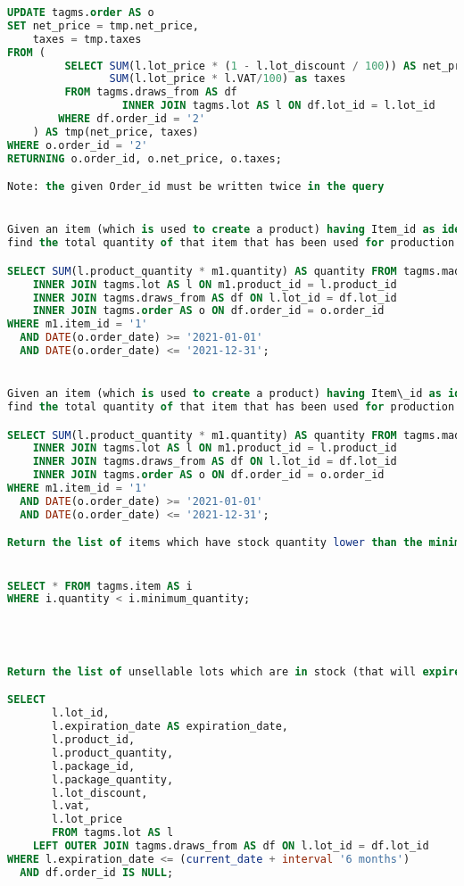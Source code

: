 \begin{lstlisting}[language=SQL,
keywordstyle=\color{blue},
stringstyle=\color{mauve},
showstringspaces=false,
basicstyle=\ttfamily\footnotesize]
UPDATE tagms.order AS o
SET net_price = tmp.net_price,
    taxes = tmp.taxes
FROM (
         SELECT SUM(l.lot_price * (1 - l.lot_discount / 100)) AS net_price,
                SUM(l.lot_price * l.VAT/100) as taxes
         FROM tagms.draws_from AS df
                  INNER JOIN tagms.lot AS l ON df.lot_id = l.lot_id
        WHERE df.order_id = '2'
    ) AS tmp(net_price, taxes)
WHERE o.order_id = '2'
RETURNING o.order_id, o.net_price, o.taxes;

Note: the given Order_id must be written twice in the query


Given an item (which is used to create a product) having Item_id as identifier and a time interval (actually, two dates), 
find the total quantity of that item that has been used for production or packaging during that time.

SELECT SUM(l.product_quantity * m1.quantity) AS quantity FROM tagms.made_up_of_1 AS m1
    INNER JOIN tagms.lot AS l ON m1.product_id = l.product_id
    INNER JOIN tagms.draws_from AS df ON l.lot_id = df.lot_id
    INNER JOIN tagms.order AS o ON df.order_id = o.order_id
WHERE m1.item_id = '1'
  AND DATE(o.order_date) >= '2021-01-01'
  AND DATE(o.order_date) <= '2021-12-31';


Given an item (which is used to create a product) having Item\_id as identifier and a time interval (actually, two dates),
find the total quantity of that item that has been used for production or packaging during that time.

SELECT SUM(l.product_quantity * m1.quantity) AS quantity FROM tagms.made_up_of_1 AS m1
    INNER JOIN tagms.lot AS l ON m1.product_id = l.product_id
    INNER JOIN tagms.draws_from AS df ON l.lot_id = df.lot_id
    INNER JOIN tagms.order AS o ON df.order_id = o.order_id
WHERE m1.item_id = '1'
  AND DATE(o.order_date) >= '2021-01-01'
  AND DATE(o.order_date) <= '2021-12-31';

Return the list of items which have stock quantity lower than the minimum one.


SELECT * FROM tagms.item AS i
WHERE i.quantity < i.minimum_quantity;




Return the list of unsellable lots which are in stock (that will expire in less than 6 months)

SELECT
       l.lot_id,
       l.expiration_date AS expiration_date,
       l.product_id,
       l.product_quantity,
       l.package_id,
       l.package_quantity,
       l.lot_discount,
       l.vat,
       l.lot_price
       FROM tagms.lot AS l
    LEFT OUTER JOIN tagms.draws_from AS df ON l.lot_id = df.lot_id
WHERE l.expiration_date <= (current_date + interval '6 months')
  AND df.order_id IS NULL;

\end{lstlisting}

